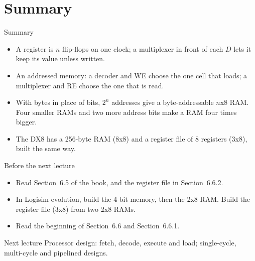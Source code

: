 \documentclass[10pt]{wosm-slides}
\begin{document}
\section{Summary}

\begin{frame}{Summary}
  \begin{itemize}
    \item A register is $n$ flip-flops on one clock; a multiplexer in front of each
      $D$ lets it keep its value unless written.
    \item An addressed memory: a decoder and WE choose the one cell that loads; a
      multiplexer and RE choose the one that is read.
    \item With bytes in place of bits, $2^n$ addresses give a byte-addressable
      $n$x8 RAM. Four smaller RAMs and two more address bits make a RAM four times
      bigger.
    \item The DX8 has a 256-byte RAM (8x8) and a register file of 8 registers (3x8),
      built the same way.
  \end{itemize}
\end{frame}

\begin{frame}{Before the next lecture}
  \begin{itemize}
    \item Read Section~6.5 of the book, and the register file in Section~6.6.2.
    \item In Logisim-evolution, build the 4-bit memory, then the 2x8 RAM. Build the
      register file (3x8) from two 2x8 RAMs.
    \item Read the beginning of Section~6.6 and Section~6.6.1.
  \end{itemize}

  \begin{block}{Next lecture }
    Processor design: fetch, decode, execute and load; single-cycle, multi-cycle and
    pipelined designs.
  \end{block}
\end{frame}
\end{document}
